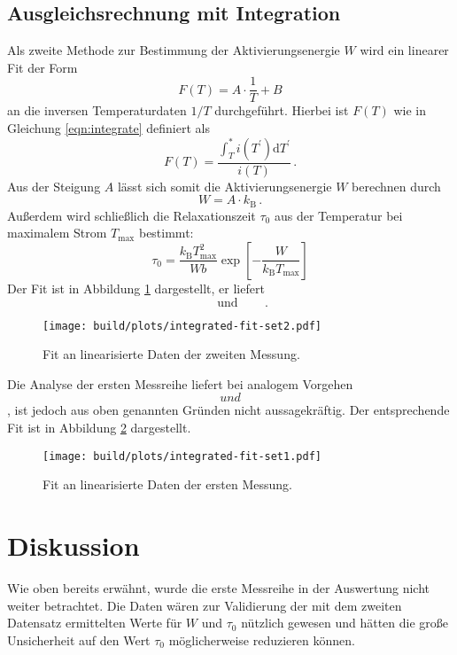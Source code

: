 \subsection{Ausgleichsrechnung mit Integration}
\label{subsec:integration}
Als zweite Methode zur Bestimmung der Aktivierungsenergie $W$ wird ein
linearer Fit der Form
\begin{equation*}
    F(T) = A\cdot\frac{1}{T} + B
\end{equation*}
an die inversen Temperaturdaten $1/T$ durchgeführt.
Hierbei ist $F(T)$ wie in Gleichung \ref{eqn:integrate} definiert als
\begin{equation*}
    F(T) = \frac{\int_T^\ast i(T^\prime)\mathrm{d}T^\prime}{i(T)}\,.
\end{equation*}
Aus der Steigung $A$ lässt sich somit die Aktivierungsenergie $W$
berechnen durch
\begin{equation*}
    W = A\cdot k_\text{B}\,.
\end{equation*}
Außerdem wird schließlich die Relaxationszeit $\tau_0$ aus der Temperatur
bei maximalem Strom $T_\text{max}$ bestimmt:
\begin{equation*}
    \tau_0 = \frac{k_\text{B}T_\text{max}^2}{Wb}
             \exp\!\left[-\frac{W}{k_\text{B}T_\text{max}} \right]
\end{equation*}
Der Fit ist in Abbildung \ref{fig:integrate_fit2} dargestellt, er liefert
\begin{equation*}
     \qquad\text{und}\qquad \,.
\end{equation*}
\begin{figure}
    \centering
    \texttt{[image: build/plots/integrated-fit-set2.pdf]}
    \caption{Fit an linearisierte Daten der zweiten Messung.}
    \label{fig:integrate_fit2}
\end{figure}
Die Analyse der ersten Messreihe liefert bei analogem Vorgehen
$$ und
$$, ist jedoch aus oben genannten
Gründen nicht aussagekräftig. Der entsprechende Fit ist in Abbildung
\ref{fig:integrate_fit1} dargestellt.
\begin{figure}
    \centering
    \texttt{[image: build/plots/integrated-fit-set1.pdf]}
    \caption{Fit an linearisierte Daten der ersten Messung.}
    \label{fig:integrate_fit1}
\end{figure}

\newpage
\section{Diskussion}
\label{sec:diskussion}
Wie oben bereits erwähnt, wurde die erste Messreihe in der Auswertung nicht
weiter betrachtet.
Die Daten wären zur Validierung der mit dem zweiten Datensatz ermittelten Werte
für $W$ und $\tau_0$ nützlich gewesen und hätten die große Unsicherheit
auf den Wert $\tau_0$ möglicherweise reduzieren können.

